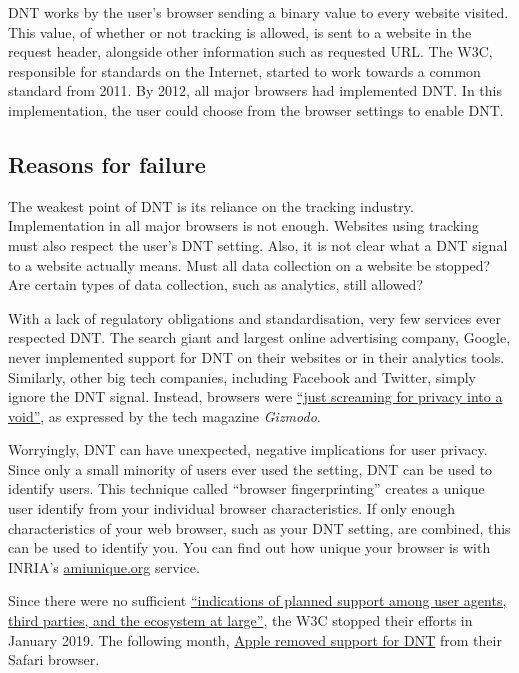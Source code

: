 \documentclass[
]{book}
\begin{document}
DNT works by the user's browser sending a binary value to every website visited. This value, of whether or not tracking is allowed, is sent to a website in the request header, alongside other information such as requested URL. The W3C, responsible for standards on the Internet, started to work towards a common standard from 2011. By 2012, all major browsers had implemented DNT. In this implementation, the user could choose from the browser settings to enable DNT.

\hypertarget{reasons-for-failure}{%
\subsection{Reasons for failure}\label{reasons-for-failure}}

The weakest point of DNT is its reliance on the tracking industry. Implementation in all major browsers is not enough. Websites using tracking must also respect the user's DNT setting. Also, it is not clear what a DNT signal to a website actually means. Must all data collection on a website be stopped? Are certain types of data collection, such as analytics, still allowed?

With a lack of regulatory obligations and standardisation, very few services ever respected DNT. The search giant and largest online advertising company, Google, never implemented support for DNT on their websites or in their analytics tools. Similarly, other big tech companies, including Facebook and Twitter, simply ignore the DNT signal. Instead, browsers were \href{https://gizmodo.com/do-not-track-the-privacy-tool-used-by-millions-of-peop-1828868324}{``just screaming for privacy into a void''}, as expressed by the tech magazine \emph{Gizmodo}.

Worryingly, DNT can have unexpected, negative implications for user privacy. Since only a small minority of users ever used the setting, DNT can be used to identify users. This technique called ``browser fingerprinting'' creates a unique user identify from your individual browser characteristics. If only enough characteristics of your web browser, such as your DNT setting, are combined, this can be used to identify you. You can find out how unique your browser is with INRIA's \href{https://amiunique.org/}{amiunique.org} service.

Since there were no sufficient \href{https://github.com/w3c/dnt/commit/5d85d6c3d116b5eb29fddc69352a77d87dfd2310}{``indications of planned support among user agents, third parties, and the ecosystem at large''}, the W3C stopped their efforts in January 2019. The following month, \href{https://www.fastcompany.com/90308068/how-the-tragic-death-of-do-not-track-ruined-the-web-for-everyone}{Apple removed support for DNT} from their Safari browser.
\end{document}
